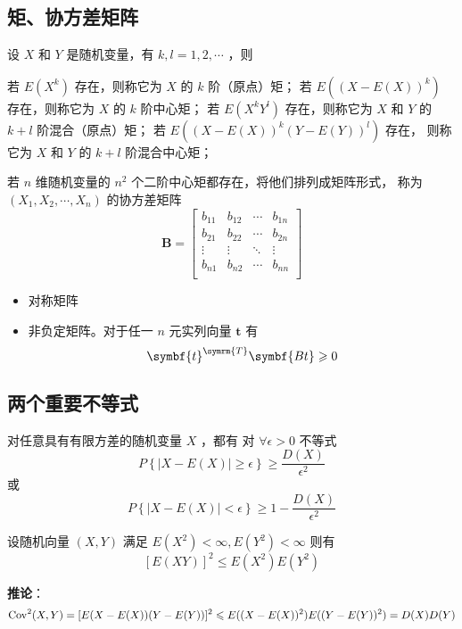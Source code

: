 \subsection{矩、协方差矩阵}

 设 $ X $ 和 $ Y $ 是随机变量，有 $ k,l = 1,2,\cdots $ ，则

 若 $ E(X^k) $ 存在，则称它为 $ X $ 的 $ k $ 阶（原点）矩；
 若 $ E((X - E(X))^k) $ 存在，则称它为  $ X $ 的 $ k $ 阶中心矩；
 若 $ E(X^kY^l) $ 存在，则称它为 $ X $ 和 $ Y $ 的 $ k+l $ 阶混合（原点）矩；
 若 $ E((X - E(X))^k (Y - E(Y))^l) $ 存在，
则称它为 $ X $ 和 $ Y $ 的 $ k+l $ 阶混合中心矩；

 若 $ n $ 维随机变量的 $ n^2 $ 个二阶中心矩都存在，将他们排列成矩阵形式，
称为 $ (X_1, X_2, \cdots, X_n) $ 的协方差矩阵
\begin{equation}
    \symbf{B} = \begin{bmatrix}
        b_{11} & b_{12} & \cdots & b_{1n} \\
        b_{21} & b_{22} & \cdots & b_{2n} \\
        \vdots & \vdots & \ddots & \vdots \\
        b_{n1} & b_{n2} & \cdots & b_{nn} \\
    \end{bmatrix}
\end{equation}

\begin{itemize}[leftmargin=\subparitemindent]
    \item 对称矩阵
    \item 非负定矩阵。对于任一 $ n $ 元实列向量 $ \symbf{t} $ 有
    $$ \symbf{t}^{\symrm{T}} \symbf{Bt} \geqslant 0 $$
\end{itemize}

\subsection{两个重要不等式}

 对任意具有有限方差的随机变量 $ X $ ，都有
对 $ \forall \epsilon > 0 $ 不等式
\begin{equation}
    P\left\{ \left| X - E(X) \right| \geqslant \epsilon \right\} \geqslant \frac{D(X)}{\epsilon^2}
\end{equation}
或
\begin{equation}
    P\left\{ \left| X - E(X) \right| < \epsilon \right\} \geqslant 1 - \frac{D(X)}{\epsilon^2}
\end{equation}

 设随机向量 $ (X,Y) $ 满足 $ E(X^2) < \infty, E(Y^2) < \infty $
则有 $$ \left[ E(XY) \right]^2 \leqslant E(X^2)E(Y^2) $$

\textbf{推论}：
$$ \mathrm{Cov}^2(X,Y) = [E(X - E(X))(Y - E(Y))]^2 \leqslant E((X - E(X))^2)E((Y - E(Y))^2) = D(X)D(Y) $$